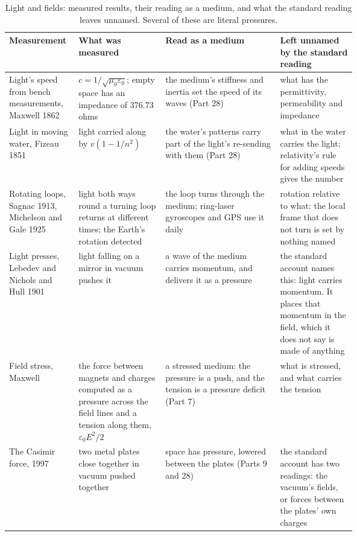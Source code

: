\documentclass[11pt,a4paper]{article}
\begin{document}
\begin{table}[p]\centering\footnotesize
\caption{Light and fields: measured results, their reading as a medium, and what the standard reading leaves unnamed. Several of these are literal pressures.}
\renewcommand{\arraystretch}{1.08}\begin{tabularx}{\linewidth}{@{}>{\raggedright\arraybackslash}p{0.2\linewidth} >{\raggedright\arraybackslash}p{0.25\linewidth} >{\raggedright\arraybackslash}X >{\raggedright\arraybackslash}p{0.22\linewidth}@{}}\toprule
\textbf{Measurement} & \textbf{What was measured} & \textbf{Read as a medium} & \textbf{Left unnamed by the standard reading}\\\midrule
Light's speed from bench measurements, Maxwell 1862 & $c=1/\sqrt{\mu_0\varepsilon_0}$; empty space has an impedance of 376.73 ohms & the medium's stiffness and inertia set the speed of its waves (Part 28) & what has the permittivity, permeability and impedance\\
Light in moving water, Fizeau 1851 & light carried along by $v(1-1/n^2)$ & the water's patterns carry part of the light's re-sending with them (Part 28) & what in the water carries the light; relativity's rule for adding speeds gives the number\\
Rotating loops, Sagnac 1913, Michelson and Gale 1925 & light both ways round a turning loop returns at different times; the Earth's rotation detected & the loop turns through the medium; ring-laser gyroscopes and GPS use it daily & rotation relative to what: the local frame that does not turn is set by nothing named\\
Light presses, Lebedev and Nichols and Hull 1901 & light falling on a mirror in vacuum pushes it & a wave of the medium carries momentum, and delivers it as a pressure & the standard account names this: light carries momentum. It places that momentum in the field, which it does not say is made of anything\\
Field stress, Maxwell & the force between magnets and charges computed as a pressure across the field lines and a tension along them, $\varepsilon_0E^2/2$ & a stressed medium: the pressure is a push, and the tension is a pressure deficit (Part 7) & what is stressed, and what carries the tension\\
The Casimir force, 1997 & two metal plates close together in vacuum pushed together & space has pressure, lowered between the plates (Parts 9 and 28) & the standard account has two readings: the vacuum's fields, or forces between the plates' own charges\\

\end{tabularx}
\end{table}
\end{document}
